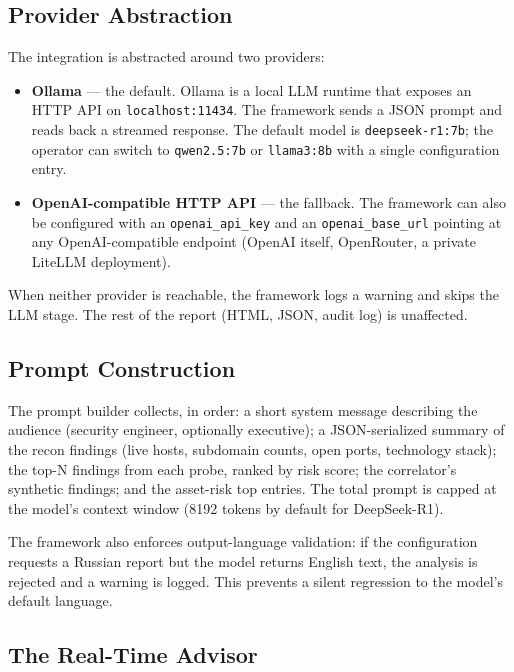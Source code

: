 \subsection{Provider Abstraction}

The integration is abstracted around two providers:

\begin{itemize}
  \item \textbf{Ollama} --- the default. Ollama is a local LLM runtime that exposes an HTTP API on \texttt{localhost:11434}. The framework sends a JSON prompt and reads back a streamed response. The default model is \texttt{deepseek-r1:7b}; the operator can switch to \texttt{qwen2.5:7b} or \texttt{llama3:8b} with a single configuration entry.
  \item \textbf{OpenAI-compatible HTTP API} --- the fallback. The framework can also be configured with an \texttt{openai\_api\_key} and an \texttt{openai\_base\_url} pointing at any OpenAI-compatible endpoint (OpenAI itself, OpenRouter, a private LiteLLM deployment).
\end{itemize}

When neither provider is reachable, the framework logs a warning and skips the LLM stage. The rest of the report (HTML, JSON, audit log) is unaffected.

\subsection{Prompt Construction}

The prompt builder collects, in order: a short system message describing the audience (security engineer, optionally executive); a JSON-serialized summary of the recon findings (live hosts, subdomain counts, open ports, technology stack); the top-N findings from each probe, ranked by risk score; the correlator's synthetic findings; and the asset-risk top entries. The total prompt is capped at the model's context window (8192 tokens by default for DeepSeek-R1).

The framework also enforces output-language validation: if the configuration requests a Russian report but the model returns English text, the analysis is rejected and a warning is logged. This prevents a silent regression to the model's default language.

\subsection{The Real-Time Advisor}

